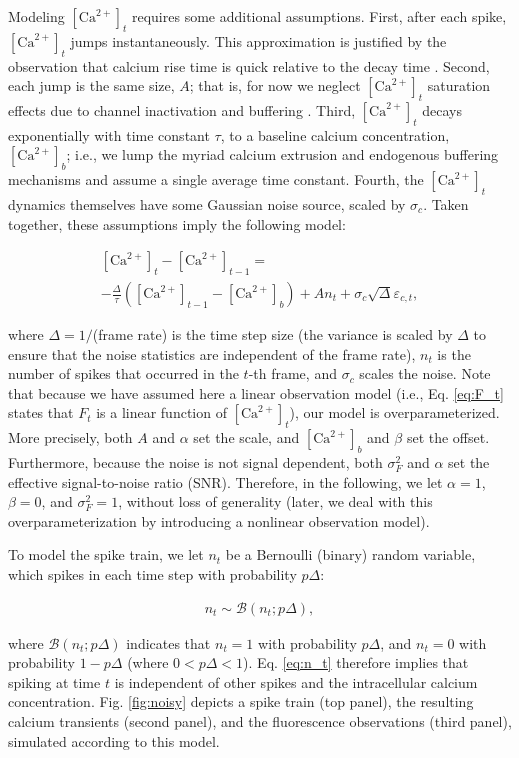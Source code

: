 \documentclass[10pt]{article}
\newcommand{\Ca}{[\text{Ca}^{2+}]}
\begin{document}
Modeling $\Ca_t$ requires some additional assumptions. First, after each spike, $\Ca_t$ jumps instantaneously. This approximation is justified by the observation that calcium rise time is quick relative to the decay time \cite{YasudaSvoboda04, CornelisseMansvelder07}. Second, each jump is the same size, $A$; that is, for now we neglect $\Ca_t$ saturation effects due to channel inactivation and buffering \cite{RegehrAtluri95}. Third, $\Ca_t$ decays exponentially with time constant $\tau$, to a baseline calcium concentration, $\Ca_b$; i.e., we lump the myriad calcium extrusion and endogenous buffering mechanisms and assume a single average time constant. Fourth, the $\Ca_t$ dynamics themselves have some Gaussian noise source, scaled by $\sigma_c$. Taken together, these assumptions imply the following model:

\begin{multline} \label{eq:C_t}
\Ca_t - \Ca_{t-1} =\\ -\frac{\Delta}{\tau}(\Ca_{t-1}-\Ca_b) + A n_t + \sigma_c \sqrt{\Delta} \varepsilon_{c,t},%
\end{multline}

\noindent where $\Delta=1/$(frame rate) is the time step size (the variance is scaled by $\Delta$ to ensure that the noise statistics are independent of the frame rate), $n_t$ is the number of spikes that occurred in the $t$-th frame, and $\sigma_c$ scales the noise. Note that because we have assumed here a linear observation model (i.e., Eq. \ref{eq:F_t} states that $F_t$ is a linear function of $\Ca_t$), our model is overparameterized. More precisely, both $A$ and $\alpha$ set the scale, and $\Ca_b$ and $\beta$ set the offset. Furthermore, because the noise is not signal dependent, both $\sigma_F^2$ and $\alpha$ set the effective signal-to-noise ratio (SNR).  Therefore, in the following, we let $\alpha=1$, $\beta=0$, and $\sigma_F^2=1$, without loss of generality (later, we deal with this overparameterization by introducing a nonlinear observation model). 

To model the spike train, we let $n_t$ be a Bernoulli (binary) random variable, which spikes in each time step with probability $p \Delta$:

\begin{align} \label{eq:n_t}
n_t \sim \mathcal{B}(n_t; p \Delta),
\end{align}

\noindent where $\mathcal{B}(n_t;p \Delta)$ indicates that $n_t=1$ with probability $p \Delta$, and $n_t=0$ with probability $1-p \Delta$ (where $0 <p \Delta < 1$). Eq. \ref{eq:n_t} therefore implies that spiking at time $t$ is independent of other spikes and the intracellular calcium concentration. Fig. \ref{fig:noisy} depicts a spike train (top panel), the resulting calcium transients (second panel), and the fluorescence observations (third panel), simulated according to this model.
\end{document}
